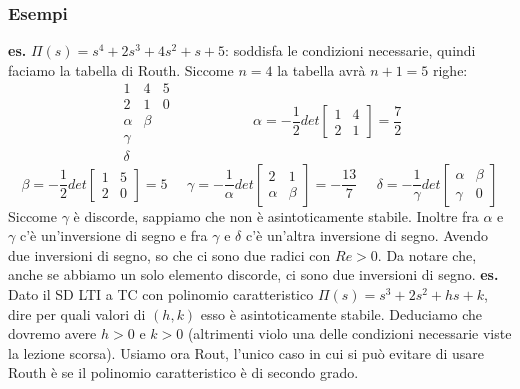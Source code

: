 \subsubsection{Esempi}
\textbf{es.} $\Pi(s) = s^4 + 2s^3 + 4s^2 + s + 5$: soddisfa le condizioni necessarie, quindi faciamo la tabella di Routh. Siccome $n=4$ la tabella avrà $n+1 = 5$ righe:
\[
    \begin{matrix}
        1 & 4 & 5 \\
        2 & 1 & 0 \\
        \alpha & \beta\\
        \gamma\\
        \delta
    \end{matrix} \;\;\;\;\;\;\;\;\;\;\;\;\;\;\;\;\;\;\;\;\alpha = - \frac{1}{2}det\left[\begin{matrix}
        1&4\\2&1
    \end{matrix}\right] = \frac{7}{2}
\]
\[
     \beta = - \frac{1}{2}det\left[\begin{matrix}
        1&5\\2&0
    \end{matrix}\right]=5 \;\;\;\;\; \gamma= -\frac{1}{\alpha} det \left[\begin{matrix}
        2&1\\\alpha&\beta
    \end{matrix}\right] = - \frac{13}{7} \;\;\;\;\; \delta = - \frac{1}{\gamma} det \left[\begin{matrix}
        \alpha & \beta \\ \gamma &0
    \end{matrix}\right]
\]
Siccome $\gamma$ è discorde, sappiamo che non è asintoticamente stabile.\newline
Inoltre fra $\alpha$ e $\gamma$ c'è un'inversione di segno e fra $\gamma$ e $\delta$ c'è un'altra inversione di segno. Avendo due inversioni di segno, so che ci sono due radici con $Re > 0$. Da notare che, anche se abbiamo un solo elemento discorde, ci sono due inversioni di segno.\newline
\newline
\textbf{es.} Dato il SD LTI a TC con polinomio caratteristico $\Pi(s) = s^3 + 2s^2 + hs +k$, dire per quali valori di $(h,k)$ esso è asintoticamente stabile.\newline
Deduciamo che dovremo avere $h>0$ e $k>0$ (altrimenti violo una delle condizioni necessarie viste la lezione scorsa). Usiamo ora Rout, l'unico caso in cui si può evitare di usare Routh è se il polinomio caratteristico è di secondo grado.
